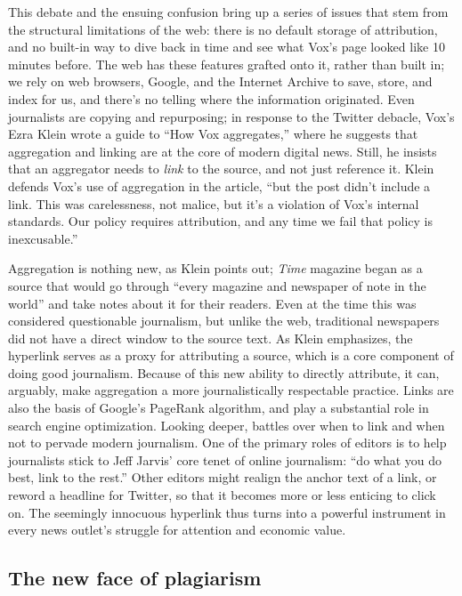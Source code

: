 This debate and the ensuing confusion bring up a series of issues that stem from the structural limitations of the web: there is no default storage of attribution, and no built-in way to dive back in time and see what Vox's page looked like 10 minutes before. The web has these features grafted onto it, rather than built in; we rely on web browsers, Google, and the Internet Archive to save, store, and index for us, and there's no telling where the information originated. Even journalists are copying and repurposing; in response to the Twitter debacle, Vox's Ezra Klein wrote a guide to ``How Vox aggregates,'' where he suggests that aggregation and linking are at the core of modern digital news. Still, he insists that an aggregator needs to \emph{link} to the source, and not just reference it. Klein defends Vox's use of aggregation in the article, ``but the post didn't include a link. This was carelessness, not malice, but it's a violation of Vox's internal standards. Our policy requires attribution, and any time we fail that policy is inexcusable.''\autocite{klein_how_2015}

Aggregation is nothing new, as Klein points out; \emph{Time} magazine began as a source that would go through ``every magazine and newspaper of note in the world'' and take notes about it for their readers. Even at the time this was considered questionable journalism, but unlike the web, traditional newspapers did not have a direct window to the source text. As Klein emphasizes, the hyperlink serves as a proxy for attributing a source, which is a core component of doing good journalism. Because of this new ability to directly attribute, it can, arguably, make aggregation a more journalistically respectable practice. Links are also the basis of Google's PageRank algorithm, and play a substantial role in search engine optimization. Looking deeper, battles over when to link and when not to pervade modern journalism. One of the primary roles of editors is to help journalists stick to Jeff Jarvis' core tenet of online journalism: ``do what you do best, link to the rest.''\autocite{jarvis_new_2007} Other editors might realign the anchor text of a link, or reword a headline for Twitter, so that it becomes more or less enticing to click on.\autocite{thompson_upworthy:_2013} The seemingly innocuous hyperlink thus turns into a powerful instrument in every news outlet's struggle for attention and economic value.

\subsection{The new face of plagiarism}

